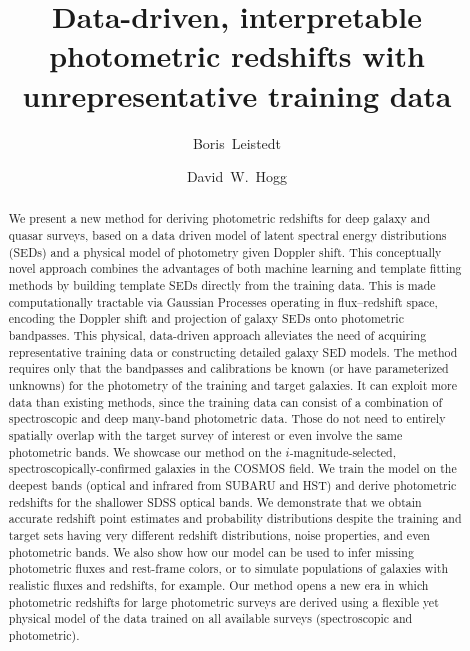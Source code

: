 \documentclass[aps,prd,showpacs,superscriptaddress,groupedaddress]{revtex4}  %
\begin{document}
 
\title{Data-driven, interpretable photometric redshifts with unrepresentative training data}

\author{Boris~Leistedt}
  
\author{David~W.~Hogg}
  
  
\begin{abstract}
We present a new method for deriving photometric redshifts for deep galaxy and quasar surveys, based on a data driven model of latent spectral energy distributions (SEDs) and a physical model of photometry given Doppler shift.
This conceptually novel approach combines the advantages of both machine learning and template fitting methods by building template SEDs directly from the training data. 
This is made computationally tractable via Gaussian Processes operating in flux--redshift space, encoding the Doppler shift and projection of galaxy SEDs onto photometric bandpasses.  
This physical, data-driven approach alleviates the need of acquiring representative training data or constructing detailed galaxy SED models.
The method requires only that the bandpasses and calibrations be known (or have parameterized unknowns) for the photometry of the training and target galaxies.
It can exploit more data than existing methods, since the training data can consist of a combination of spectroscopic and deep many-band photometric data.
Those do not need to entirely spatially overlap with the target survey of interest or even involve the same photometric bands. 
We showcase our method on the $i$-magnitude-selected, spectroscopically-confirmed galaxies in the COSMOS field. 
We train the model on the deepest bands (optical and infrared from SUBARU and HST) and derive photometric redshifts for the shallower SDSS optical bands.
We demonstrate that we obtain accurate redshift point estimates and probability distributions despite the training and target sets having very different redshift distributions, noise properties, and even photometric bands.
We also show how our model can be used to infer missing photometric fluxes and rest-frame colors, or to simulate populations of galaxies with realistic fluxes and redshifts, for example.
Our method opens a new era in which photometric redshifts for large photometric surveys are derived using a flexible yet physical model of the data trained on all available surveys (spectroscopic and photometric).
\end{abstract}
\end{document}
